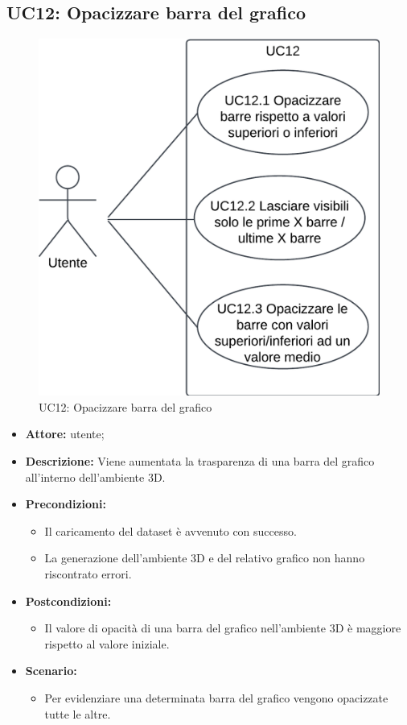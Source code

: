 \subsection{UC12: Opacizzare barra del grafico}
\begin{figure}[h!]\centering
    \includegraphics[scale=0.7]{template/images/UC12.png}
    \caption{UC12: Opacizzare barra del grafico}
\end{figure}
\begin{itemize}    
    \item \textbf{Attore:} utente;
    \item \textbf{Descrizione:} Viene aumentata la trasparenza di una barra del grafico all'interno dell'ambiente 3D.
    \item \textbf{Precondizioni:}    
        \begin{itemize}
            \item Il caricamento del dataset è avvenuto con successo.
            \item La generazione dell'ambiente 3D e del relativo grafico non hanno riscontrato errori.
        \end{itemize}    
    \item \textbf{Postcondizioni:}
        \begin{itemize}
            \item Il valore di opacità di una barra del grafico nell'ambiente 3D è maggiore rispetto al valore iniziale.
        \end{itemize}    
    \item \textbf{Scenario:} 
        \begin{itemize}
            \item Per evidenziare una determinata barra del grafico vengono opacizzate tutte le altre.
        \end{itemize}
\end{itemize}
